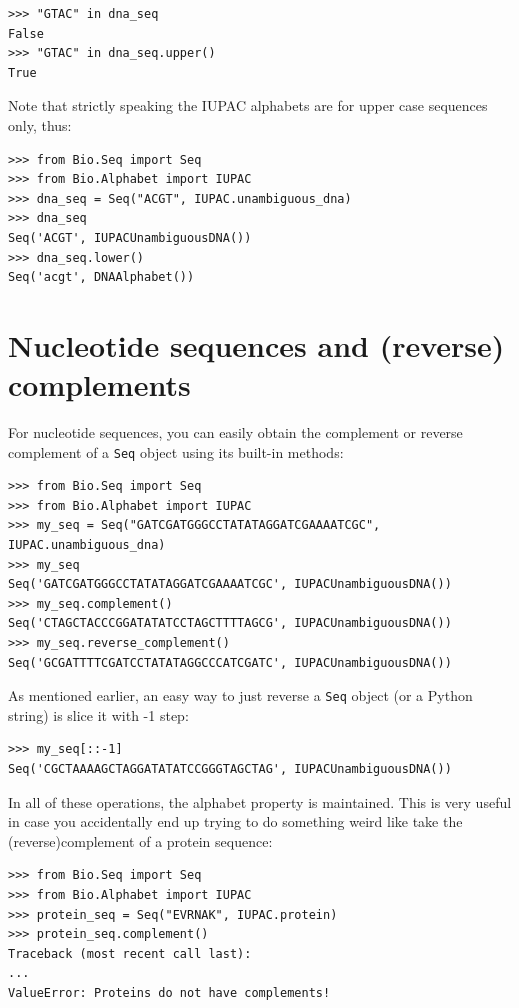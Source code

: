 \documentclass{report}
\begin{document}
\begin{verbatim}
>>> "GTAC" in dna_seq
False
>>> "GTAC" in dna_seq.upper()
True
\end{verbatim}

Note that strictly speaking the IUPAC alphabets are for upper case
sequences only, thus:

\begin{verbatim}
>>> from Bio.Seq import Seq
>>> from Bio.Alphabet import IUPAC
>>> dna_seq = Seq("ACGT", IUPAC.unambiguous_dna)
>>> dna_seq
Seq('ACGT', IUPACUnambiguousDNA())
>>> dna_seq.lower()
Seq('acgt', DNAAlphabet())
\end{verbatim}


\section{Nucleotide sequences and (reverse) complements}
\label{sec:seq-reverse-complement}

For nucleotide sequences, you can easily obtain the complement or reverse
complement of a \verb|Seq| object using its built-in methods:

\begin{verbatim}
>>> from Bio.Seq import Seq
>>> from Bio.Alphabet import IUPAC
>>> my_seq = Seq("GATCGATGGGCCTATATAGGATCGAAAATCGC", IUPAC.unambiguous_dna)
>>> my_seq
Seq('GATCGATGGGCCTATATAGGATCGAAAATCGC', IUPACUnambiguousDNA())
>>> my_seq.complement()
Seq('CTAGCTACCCGGATATATCCTAGCTTTTAGCG', IUPACUnambiguousDNA())
>>> my_seq.reverse_complement()
Seq('GCGATTTTCGATCCTATATAGGCCCATCGATC', IUPACUnambiguousDNA())
\end{verbatim}

As mentioned earlier, an easy way to just reverse a \verb|Seq| object (or a
Python string) is slice it with -1 step:

\begin{verbatim}
>>> my_seq[::-1]
Seq('CGCTAAAAGCTAGGATATATCCGGGTAGCTAG', IUPACUnambiguousDNA())
\end{verbatim}

In all of these operations, the alphabet property is maintained. This is very
useful in case you accidentally end up trying to do something weird like take
the (reverse)complement of a protein sequence:

\begin{verbatim}
>>> from Bio.Seq import Seq
>>> from Bio.Alphabet import IUPAC
>>> protein_seq = Seq("EVRNAK", IUPAC.protein)
>>> protein_seq.complement()
Traceback (most recent call last):
...
ValueError: Proteins do not have complements!
\end{verbatim}
\end{document}
